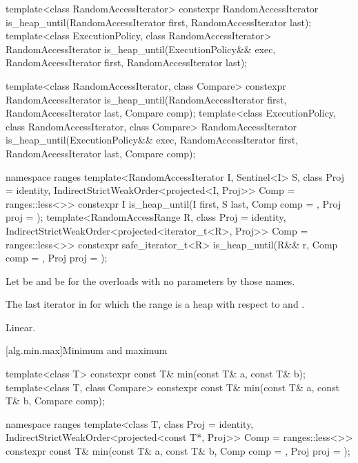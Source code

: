 %
\begin{itemdecl}
template<class RandomAccessIterator>
  constexpr RandomAccessIterator
    is_heap_until(RandomAccessIterator first, RandomAccessIterator last);
template<class ExecutionPolicy, class RandomAccessIterator>
  RandomAccessIterator
    is_heap_until(ExecutionPolicy&& exec,
                  RandomAccessIterator first, RandomAccessIterator last);

template<class RandomAccessIterator, class Compare>
  constexpr RandomAccessIterator
    is_heap_until(RandomAccessIterator first, RandomAccessIterator last,
                  Compare comp);
template<class ExecutionPolicy, class RandomAccessIterator, class Compare>
  RandomAccessIterator
    is_heap_until(ExecutionPolicy&& exec,
                  RandomAccessIterator first, RandomAccessIterator last,
                  Compare comp);

namespace ranges {
  template<RandomAccessIterator I, Sentinel<I> S, class Proj = identity,
           IndirectStrictWeakOrder<projected<I, Proj>> Comp = ranges::less<>>
    constexpr I is_heap_until(I first, S last, Comp comp = {}, Proj proj = {});
  template<RandomAccessRange R, class Proj = identity,
           IndirectStrictWeakOrder<projected<iterator_t<R>, Proj>> Comp = ranges::less<>>
    constexpr safe_iterator_t<R>
      is_heap_until(R&& r, Comp comp = {}, Proj proj = {});
}
\end{itemdecl}

\begin{itemdescr}
\pnum
Let  be 
and  be 
for the overloads with no parameters by those names.

\pnum
\returns
The last iterator  in 
for which the range 
is a heap with respect to  and .

\pnum
\complexity
Linear.
\end{itemdescr}


[alg.min.max]{Minimum and maximum}

%
\begin{itemdecl}
template<class T>
  constexpr const T& min(const T& a, const T& b);
template<class T, class Compare>
  constexpr const T& min(const T& a, const T& b, Compare comp);

namespace ranges {
  template<class T, class Proj = identity,
           IndirectStrictWeakOrder<projected<const T*, Proj>> Comp = ranges::less<>>
    constexpr const T& min(const T& a, const T& b, Comp comp = {}, Proj proj = {});
}
\end{itemdecl}

